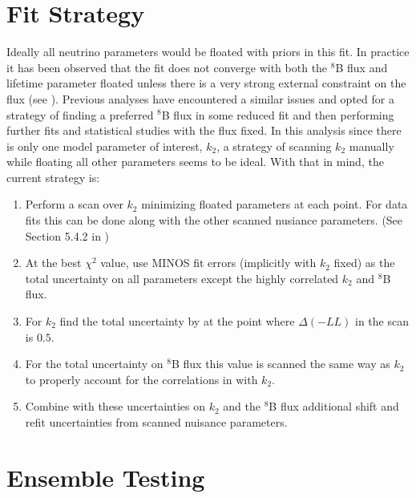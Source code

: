 \section{Fit Strategy}
\label{strategy}
Ideally all neutrino parameters would be floated with priors in this fit. 
In practice it has been observed that the fit does not converge with both the $^8$B flux and lifetime parameter floated unless there is a very strong external constraint on the flux (see ).
Previous analyses \cite{plthesis} have encountered a similar issues and opted for a strategy of finding a preferred $^8$B flux in some reduced fit and then performing further fits and statistical studies with the flux fixed.
In this analysis since there is only one model parameter of interest, $k_2$, a strategy of scanning $k_2$ manually while floating all other parameters seems to be ideal. 
With that in mind, the current strategy is:
\begin{enumerate}
\item Perform a scan over $k_2$ minimizing floated parameters at each point. For data fits this can be done along with the other scanned nusiance parameters. (See Section 5.4.2 in \cite{plthesis})
\item At the best $\chi^2$ value, use MINOS fit errors (implicitly with $k_2$ fixed) as the total uncertainty on all parameters except the highly correlated $k_2$ and $^8$B flux.
\item For $k_2$ find the total uncertainty by at the point where $\Delta(-LL)$ in the scan is $0.5$.
\item For the total uncertainty on $^8$B flux this value is scanned the same way as $k_2$ to properly account for the correlations in with $k_2$.
\item Combine with these uncertainties on $k_2$ and the $^8$B flux additional shift and refit uncertainties from scanned nuisance parameters.
\end{enumerate}

\section{Ensemble Testing}
\label{ensemble_tests}

